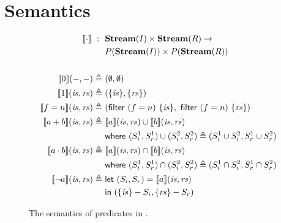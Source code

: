 \documentclass[sigconf,usenames,dvipsnames,svgnames,table]{acmart}
\begin{document}
        
\section {Semantics}
        \begin{figure}
          \centering
          \begin{align*}
            \interp{ \cdot }\ 
              :\ \ &
              \mathbf{Stream}(I)\times \mathbf{Stream}(R) \rightarrow \\
              & P(\mathbf{Stream}(I))\times P(\mathbf{Stream}(R)) 
              \\
              \\
            \interp{ 0 }(-, -)
              \defeq\ &
              (\emptyset , \emptyset)
              \\ %
            \interp{ 1 }(\mathit{is}, \mathit{rs})
              \defeq\ &
              (\{\mathit{is}\},\{\mathit{rs}\})
              \\
            \interp{ f=n }(\mathit{is}, \mathit{rs})
              \defeq\ &
              (\mathsf{filter}\ (f=n)\ \{\mathit{is}\},\
               \mathsf{filter}\ (f=n)\ \{\mathit{rs}\}) 
              \\
            \interp{ a + b }(\mathit{is}, \mathit{rs})
              \defeq\ &
              \interp { a }(\mathit{is}, \mathit{rs})\cup
              \interp { b }(\mathit{is}, \mathit{rs}) \\
              &\mathsf{where}\ (S_i^1, S_r^1)\cup (S_i^2, S_r^2)\defeq
                (S_i^1\cup S_i^2, S_r^1\cup S_r^2)\\
            \interp { a \cdot b }(\mathit{is}, \mathit{rs})
              \defeq\ &
              \interp { a }(\mathit{is}, \mathit{rs})\cap
              \interp { b }(\mathit{is}, \mathit{rs}) \\
              &\mathsf{where}\ (S_i^1, S_r^1)\cap (S_i^2, S_r^2)\defeq
                (S_i^1\cap S_i^2, S_r^1\cap S_r^2)\\
            \interp { \neg a }(\mathit{is}, \mathit{rs})
              \defeq\ &
              \mathsf{let}\ (S_i, S_r) = \interp {a}(\mathit{is}, \mathit{rs}) \\
              &\mathsf{in}\ (\{\mathit{is}\} - S_i, \{\mathit{rs}\} - S_r)
          \end{align*}
          \caption{The semantics of predicates in \oldname.}
          \label{fig:garuda:sem:pred}
        \end{figure}
\end{document}
